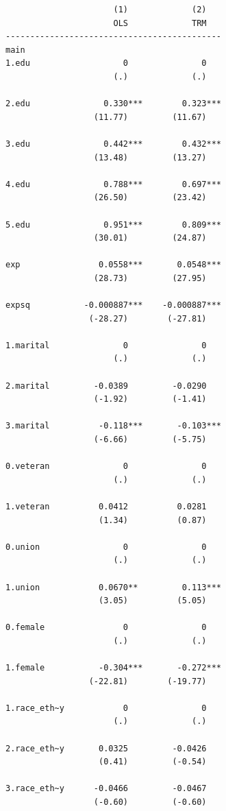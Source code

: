 \documentclass[
]{book}
\begin{document}
\begin{verbatim}
                      (1)             (2)   
                      OLS             TRM   
--------------------------------------------
main                                        
1.edu                   0               0   
                      (.)             (.)   

2.edu               0.330***        0.323***
                  (11.77)         (11.67)   

3.edu               0.442***        0.432***
                  (13.48)         (13.27)   

4.edu               0.788***        0.697***
                  (26.50)         (23.42)   

5.edu               0.951***        0.809***
                  (30.01)         (24.87)   

exp                0.0558***       0.0548***
                  (28.73)         (27.95)   

expsq           -0.000887***    -0.000887***
                 (-28.27)        (-27.81)   

1.marital               0               0   
                      (.)             (.)   

2.marital         -0.0389         -0.0290   
                  (-1.92)         (-1.41)   

3.marital          -0.118***       -0.103***
                  (-6.66)         (-5.75)   

0.veteran               0               0   
                      (.)             (.)   

1.veteran          0.0412          0.0281   
                   (1.34)          (0.87)   

0.union                 0               0   
                      (.)             (.)   

1.union            0.0670**         0.113***
                   (3.05)          (5.05)   

0.female                0               0   
                      (.)             (.)   

1.female           -0.304***       -0.272***
                 (-22.81)        (-19.77)   

1.race_eth~y            0               0   
                      (.)             (.)   

2.race_eth~y       0.0325         -0.0426   
                   (0.41)         (-0.54)   

3.race_eth~y      -0.0466         -0.0467   
                  (-0.60)         (-0.60)   


\end{verbatim}
\end{document}
